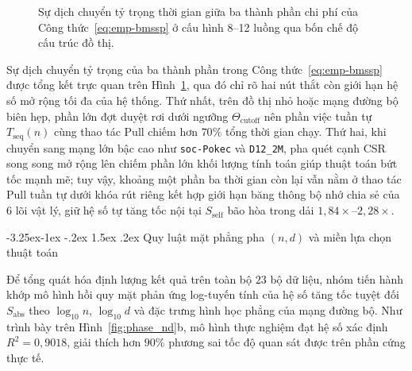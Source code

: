 \documentclass[12pt,a4paper,openany,oneside]{report}
\makeatletter
\theoremstyle{plain}
\renewcommand\subsection{\@startsection{subsection}{2}{\z@}
    {-3.25ex\@plus -1ex \@minus -.2ex}
    {1.5ex \@plus .2ex}
    {\normalfont\normalsize\bfseries}}
\numberwithin{equation}{section}
\def\textsc#1{#1}%
\makeatother
\begin{document}
\begin{figure}[!htb]
{%
}
\caption{Sự dịch chuyển tỷ trọng thời gian giữa ba thành phần chi phí của Công thức~\eqref{eq:emp-bmssp} ở cấu hình 8--12 luồng qua bốn chế độ cấu trúc đồ thị.}
\label{fig:tikz_arch_regime}
\end{figure}

Sự dịch chuyển tỷ trọng của ba thành phần trong Công thức~\eqref{eq:emp-bmssp} được tổng kết trực quan trên Hình~\ref{fig:tikz_arch_regime}, qua đó chỉ rõ hai nút thắt còn giới hạn hệ số mở rộng tối đa của hệ thống. Thứ nhất, trên đồ thị nhỏ hoặc mạng đường bộ biên hẹp, phần lớn đợt duyệt rơi dưới ngưỡng $\Theta_{\mathrm{cutoff}}$ nên phần việc tuần tự $T_{\mathrm{seq}}(n)$ cùng thao tác \textsc{Pull} chiếm hơn $70\%$ tổng thời gian chạy. Thứ hai, khi chuyển sang mạng lớn bậc cao như \texttt{soc-Pokec} và \texttt{D12\_2M}, pha quét cạnh CSR song song mở rộng lên chiếm phần lớn khối lượng tính toán giúp thuật toán bứt tốc mạnh mẽ; tuy vậy, khoảng một phần ba thời gian còn lại vẫn nằm ở thao tác \textsc{Pull} tuần tự dưới khóa rút riêng kết hợp giới hạn băng thông bộ nhớ chia sẻ của $6$ lõi vật lý, giữ hệ số tự tăng tốc nội tại $S_{\mathrm{self}}$ bão hòa trong dải $1{,}84\times$--$2{,}28\times$.

\subsection{Quy luật mặt phẳng pha $(n, d)$ và miền lựa chọn thuật toán}\label{subsec:c3-phase-law}

Để tổng quát hóa định lượng kết quả trên toàn bộ $23$ bộ dữ liệu, nhóm tiến hành khớp mô hình hồi quy mặt phản ứng log-tuyến tính của hệ số tăng tốc tuyệt đối $S_{\mathrm{abs}}$ theo $\log_{10} n$, $\log_{10} d$ và đặc trưng hình học phẳng của mạng đường bộ. Như trình bày trên Hình~\ref{fig:phase_nd}b, mô hình thực nghiệm đạt hệ số xác định $R^2 = 0{,}9018$, giải thích hơn $90\%$ phương sai tốc độ quan sát được trên phần cứng thực tế.
\end{document}
